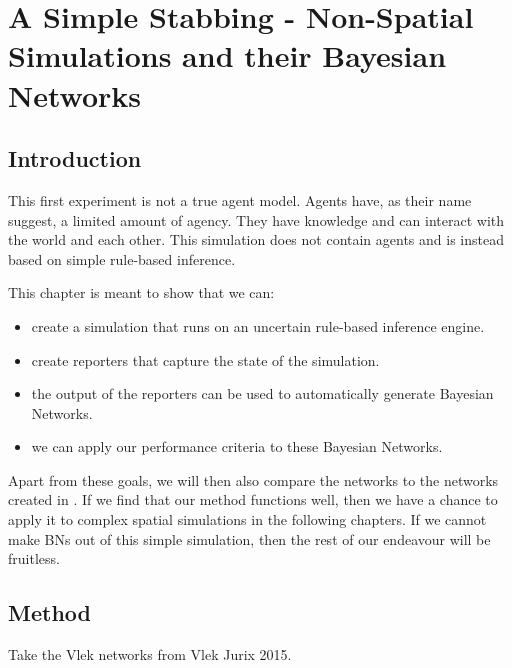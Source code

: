  

\chapter[Simple Non-Spatial Simulations]{A Simple Stabbing - Non-Spatial Simulations and their Bayesian Networks}

\section{Introduction}

This first experiment is not a true agent model. Agents have, as their name suggest, a limited amount of agency. They have knowledge and can interact with the world and each other. This simulation does not contain agents and is instead based on simple rule-based inference.

This chapter is meant to show that we can:
\begin{itemize}
\item create a simulation that runs on an uncertain rule-based inference engine. 
\item create reporters that capture the state of the simulation.
\item the output of the reporters can be used to automatically generate Bayesian Networks.
\item we can apply our performance criteria to these Bayesian Networks.
\end{itemize}

Apart from these goals, we will then also compare the networks to the networks created in \citet{Vlek2015}. If we find that our method functions well, then we have a chance to apply it to complex spatial simulations in the following chapters. If we cannot make BNs out of this simple simulation, then the rest of our endeavour will be fruitless.

\section{Method}

Take the Vlek networks from Vlek Jurix 2015.

